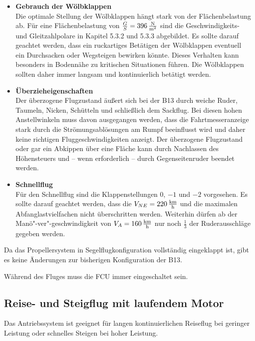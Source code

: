 \begin{itemize}
\item \textbf{Gebrauch der Wölbklappen}\\
Die optimale Stellung der Wölbklappen hängt stark von der Flächenbelastung ab. Für eine Flächenbelastung von $\frac{G}{S}=\unit[396]{\frac{N}{m^2}}$ sind die Geschwindigkeits- und Gleitzahlpolare in Kapitel 5.3.2 und 5.3.3 abgebildet. 
Es sollte darauf geachtet werden, dass ein ruckartiges Betätigen der Wölbklappen eventuell ein Durchsacken oder Wegsteigen bewirken könnte. Dieses Verhalten kann besonders in Bodennähe zu kritischen Situationen führen. Die Wölbklappen sollten daher immer langsam und kontinuierlich betätigt werden. 
\item \textbf{Überzieheigenschaften}\\
Der überzogene Flugzustand äußert sich bei der B13 durch weiche Ruder, Taumeln, Nicken, Schütteln und schließlich dem Sackflug. Bei diesen hohen Anstellwinkeln muss davon ausgegangen werden, dass die Fahrtmesseranzeige stark durch die Strömungsablösungen am Rumpf beeinflusst wird und daher keine richtigen Fluggeschwindigkeiten anzeigt.  Der überzogene Flugzustand oder gar ein Abkippen über eine Fläche kann durch Nachlassen des Höhensteuers und – wenn erforderlich – durch Gegenseitenruder beendet werden. 
\item \textbf{Schnellflug}\\
Für den Schnellflug sind die Klappenstellungen $0$, $-1$ und $-2$ vorgesehen. Es sollte darauf geachtet werden, dass die $V_{NE} = \unit[220]{\frac{km}{h}}$  und die maximalen Abfanglastvielfachen nicht überschritten werden. Weiterhin dürfen ab der Manö"-ver"-geschwindigkeit von $V_A = \unit[160]{\frac{km}{h}}$ nur noch $\frac{1}{3}$ der Ruderausschläge gegeben werden. 

\end{itemize}

Da das Propellersystem in Segelflugkonfiguration vollständig eingeklappt ist, gibt es keine Änderungen zur bisherigen Konfiguration der B13.

Während des Fluges muss die FCU immer eingeschaltet sein.

\newpage
\subsection{Reise- und Steigflug mit laufendem Motor}
Das Antriebssystem ist geeignet für langen kontinuierlichen Reiseflug bei geringer Leistung oder schnelles Steigen bei hoher Leistung.\\

